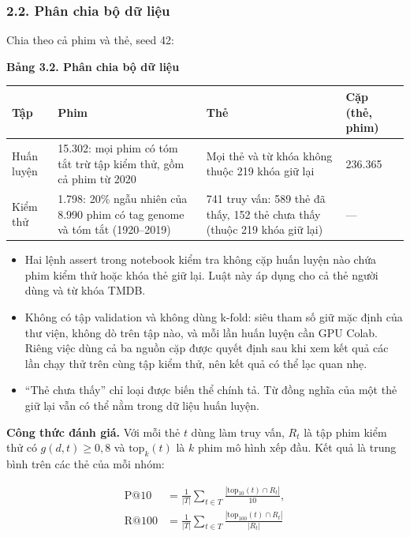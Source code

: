 \documentclass[12pt,a4paper]{article}
\providecommand{\tightlist}{\setlength{\itemsep}{0pt}\setlength{\parskip}{0pt}}
\newcommand{\npp}{\Needspace{13\baselineskip}}
\let\oldsubsubsection\subsubsection
\renewcommand{\subsubsection}{\Needspace{10\baselineskip}\oldsubsubsection}
\begin{document}
\subsubsection{2.2. Phân chia bộ dữ liệu}

Chia theo cả phim và thẻ, seed 42:

\npp\textbf{Bảng 3.2. Phân chia bộ dữ liệu}

{\def\LTcaptype{}\small
\begin{longtable}[]{@{}*{4}{P{(\linewidth - 6\tabcolsep) * }}@{}}
\toprule
\textbf{Tập} & \textbf{Phim} & \textbf{Thẻ} & \textbf{Cặp (thẻ, phim)} \\
\midrule
\endhead
\bottomrule
\endlastfoot
Huấn luyện & 15.302: mọi phim có tóm tắt trừ tập kiểm thử, gồm cả phim từ 2020 & Mọi thẻ và từ khóa không thuộc 219 khóa giữ lại & 236.365 \\
Kiểm thử & 1.798: 20\% ngẫu nhiên của 8.990 phim có tag genome và tóm tắt (1920--2019) & 741 truy vấn: 589 thẻ đã thấy, 152 thẻ chưa thấy (thuộc 219 khóa giữ lại) & --- \\
\end{longtable}
}

\begin{itemize}
\tightlist
\item Hai lệnh assert trong notebook kiểm tra không cặp huấn luyện nào chứa phim kiểm thử hoặc khóa thẻ giữ lại. Luật này áp dụng cho cả thẻ người dùng và từ khóa TMDB.
\item Không có tập validation và không dùng k-fold: siêu tham số giữ mặc định của thư viện, không dò trên tập nào, và mỗi lần huấn luyện cần GPU Colab. Riêng việc dùng cả ba nguồn cặp được quyết định sau khi xem kết quả các lần chạy thử trên cùng tập kiểm thử, nên kết quả có thể lạc quan nhẹ.
\item ``Thẻ chưa thấy'' chỉ loại được biến thể chính tả. Từ đồng nghĩa của một thẻ giữ lại vẫn có thể nằm trong dữ liệu huấn luyện.
\end{itemize}

\textbf{Công thức đánh giá.} Với mỗi thẻ $t$ dùng làm truy vấn, $R_t$ là tập phim kiểm thử có $g(d,t)\geq 0{,}8$ và $\mathrm{top}_k(t)$ là $k$ phim mô hình xếp đầu. Kết quả là trung bình trên các thẻ của mỗi nhóm:

\begin{align*}
\mathrm{P@10} &= \frac{1}{|T|}\sum_{t\in T}\frac{|\mathrm{top}_{10}(t)\cap R_t|}{10}, \\
\mathrm{R@100} &= \frac{1}{|T|}\sum_{t\in T}\frac{|\mathrm{top}_{100}(t)\cap R_t|}{|R_t|}
\end{align*}
\end{document}
